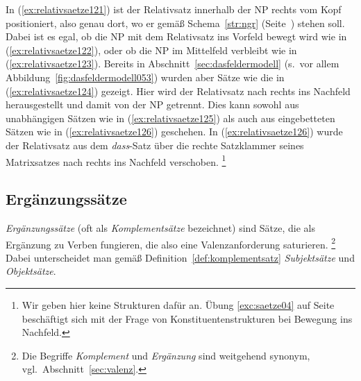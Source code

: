 \begin{exe}
  \ex\label{ex:relativsaetze121}
  \begin{xlist}
  \end{xlist}
  \ex\label{ex:relativsaetze124}
  \begin{xlist}
  \end{xlist}
\end{exe}


In (\ref{ex:relativsaetze121}) ist der Relativsatz innerhalb der NP rechts vom Kopf positioniert, also genau dort, wo er gemäß Schema~\ref{str:ngr} (Seite~\pageref{str:ngr}) stehen soll.
Dabei ist es egal, ob die NP mit dem Relativsatz ins Vorfeld bewegt wird wie in (\ref{ex:relativsaetze122}), oder ob die NP im Mittelfeld verbleibt wie in (\ref{ex:relativsaetze123}).
Bereits in Abschnitt~\ref{sec:dasfeldermodell} (s.\ vor allem Abbildung~\ref{fig:dasfeldermodell053}) wurden aber Sätze wie die in (\ref{ex:relativsaetze124}) gezeigt.
Hier wird der Relativsatz nach rechts ins Nachfeld herausgestellt und damit von der NP getrennt.
Dies kann sowohl aus unabhängigen Sätzen wie in (\ref{ex:relativsaetze125}) als auch aus eingebetteten Sätzen wie in (\ref{ex:relativsaetze126}) geschehen.
In (\ref{ex:relativsaetze126}) wurde der Relativsatz aus dem \textit{dass}-Satz über die rechte Satzklammer seines Matrixsatzes nach rechts ins Nachfeld verschoben.%
\footnote{Wir geben hier keine Strukturen dafür an.
Übung \ref{exc:saetze04} auf Seite~\pageref{exc:saetze04} beschäftigt sich mit der Frage von Konstituentenstrukturen bei Bewegung ins Nachfeld.}

\subsection{Ergänzungssätze}
\label{sec:komplementsaetze}

\textit{Ergänzungssätze} (oft als \textit{Komplementsätze} bezeichnet) sind Sätze, die als Ergänzung zu Verben fungieren, die also eine Valenzanforderung saturieren.%
\footnote{Die Begriffe \textit{Komplement} und \textit{Ergänzung} sind weitgehend synonym, vgl.\ Abschnitt~\ref{sec:valenz}.}
Dabei unterscheidet man gemäß Definition~\ref{def:komplementsatz} \textit{Subjektsätze} und \textit{Objektsätze}.


